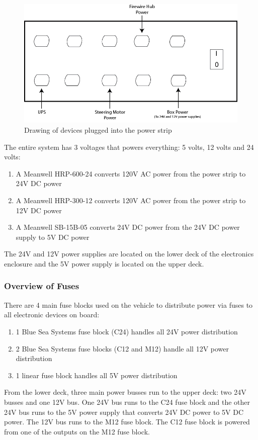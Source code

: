 \begin{figure}[h!]
\centering
\includegraphics[scale=.6]{Photos/PowerStrip_Drawing.jpg}
\caption{Drawing of devices plugged into the power strip}
\label{fig:powerstripdrawing}
\end{figure} 

\noindent The entire system has 3 voltages that powers everything: 5 volts, 12 volts and 24 volts:
\begin{enumerate}
\item A Meanwell HRP-600-24 converts 120V AC power from the power strip to 24V DC power
\item A Meanwell HRP-300-12 converts 120V AC power from the power strip to 12V DC power
\item A Meanwell SB-15B-05 converts 24V DC power from the 24V DC power supply to 5V DC power
\end{enumerate}
%
The 24V and 12V power supplies are located on the lower deck of the electronics enclosure and the 5V power supply is located on the upper deck.

\newpage 

\subsubsection{Overview of Fuses}
There are 4 main fuse blocks used on the vehicle to distribute power via fuses to all electronic devices on board:
\begin{enumerate}
\item 1 Blue Sea Systems fuse block (C24) handles all 24V power distribution
\item 2 Blue Sea Systems fuse blocks (C12 and M12) handle all 12V power distribution
\item 1 linear fuse block handles all 5V power distribution 
\end{enumerate}
%
From the lower deck, three main power busses run to the upper deck: two 24V busses and one 12V bus. One 24V bus runs to the C24 fuse block and the other 24V bus runs to the 5V power supply that converts 24V DC power to 5V DC power. The 12V bus runs to the M12 fuse block. The C12 fuse block is powered from one of the outputs on the M12 fuse block.
%
